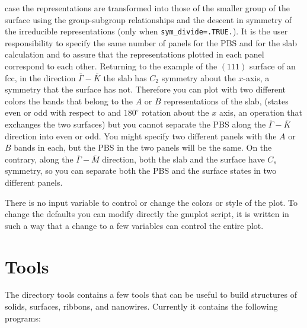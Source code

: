 \documentclass[12pt,a4paper]{article}
\begin{document}
case the representations are transformed into those of the smaller
group of the surface using the group-subgroup relationships and
the descent in symmetry of the irreducible representations
(only when \texttt{sym\_divide=.TRUE.}).
It is the user responsibility to specify the same number of panels
for the PBS and for the slab calculation and to assure that the
representations plotted in each panel correspond to each other.
Returning to the example of the $(111)$ surface of an fcc, in the direction
$\bar \Gamma-\bar K$ the slab has $C_2$ symmetry about the $x$-axis, a symmetry
that the surface has not. Therefore you can plot with two different colors
the bands that belong to the $A$ or $B$ representations of the slab,
(states even or odd with respect to and $180^\circ$  rotation about
the $x$ axis, an operation that exchanges the two surfaces)
but you cannot separate the PBS along the $\bar \Gamma-\bar K$ direction into
even or odd. You might specify two different panels with the
$A$ or $B$ bands in each, but the PBS in the two panels will be the same. 
On the contrary, along the $\bar \Gamma-\bar M$ direction, both the slab and 
the surface have $C_s$ symmetry, so you can separate both the PBS 
and the surface states in two different panels.

There is no input variable to control or change the colors or style of the 
plot. To change the defaults you can modify directly the gnuplot script,
it is written in such a way that a change to a few variables can
control the entire plot.

\section{Tools}

The directory tools contains a few tools that can be useful to build
structures of solids, surfaces, ribbons, and nanowires. Currently it contains
the following programs:
\end{document}
